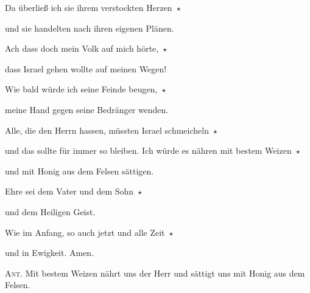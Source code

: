 \noindent Da überließ ich sie ihrem verstockten Herzen~$\star$~\nopagebreak

und sie handelten nach ihren eigenen Plänen. 

Ach dass doch mein Volk auf mich hörte,~$\star$~\nopagebreak

dass Israel gehen wollte auf meinen Wegen!

\noindent Wie bald würde ich seine Feinde beugen,~$\star$~\nopagebreak

meine Hand gegen seine Bedränger wenden. 

Alle, die den Herrn hassen, müssten Israel schmeicheln~$\star$~\nopagebreak

und das sollte für immer so bleiben. Ich würde es nähren mit bestem Weizen~$\star$~\nopagebreak

und mit Honig aus dem Felsen sättigen.

\noindent Ehre sei dem Vater und dem Sohn~$\star$~\nopagebreak

und dem Heiligen Geist.

\noindent Wie im Anfang, so auch jetzt und alle Zeit~$\star$~\nopagebreak

und in Ewigkeit. Amen.

\vspace{10pt}

\noindent \textsc{Ant.} Mit bestem Weizen nährt uns der Herr und sättigt uns mit Honig aus dem Felsen.